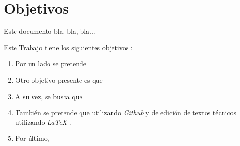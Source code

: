 %
 

\chapter{Objetivos} \label{chap:Objetivos}  

Este documento bla, bla, bla...

Este Trabajo tiene los siguientes objetivos :
	
\begin{enumerate}
\item Por un lado se pretende 

\item Otro objetivo presente es que 

\item A su vez, se busca que 

\item También se pretende que utilizando \textit{Github} \cite{URL::Github} y de edición de textos técnicos utilizando \textit{LaTeX}  \cite{URL::LaTeX}.

\item   Por último, 
\end{enumerate} 
